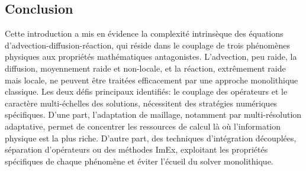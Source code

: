\subsection{Conclusion}
Cette introduction a mis en évidence la complexité intrinsèque des équations d'advection-diffusion-réaction, 
qui réside dans le couplage de trois phénomènes physiques aux propriétés mathématiques antagonistes. 
L'advection, peu raide, la diffusion, moyennement raide et non-locale, et la réaction, extrêmement raide mais locale, 
ne peuvent être traitées efficacement par une approche monolithique classique.
Les deux défis principaux identifiés: le couplage des opérateurs et le caractère multi-échelles des solutions, 
nécessitent des stratégies numériques spécifiques. 
D'une part, l'adaptation de maillage, notamment par multi-résolution adaptative, permet de concentrer les ressources de calcul là où l'information physique est la plus riche. 
D'autre part, des techniques d'intégration découplées, séparation d'opérateurs ou des méthodes ImEx, exploitant les propriétés spécifiques de chaque phénomène et éviter l'écueil du solver monolithique.